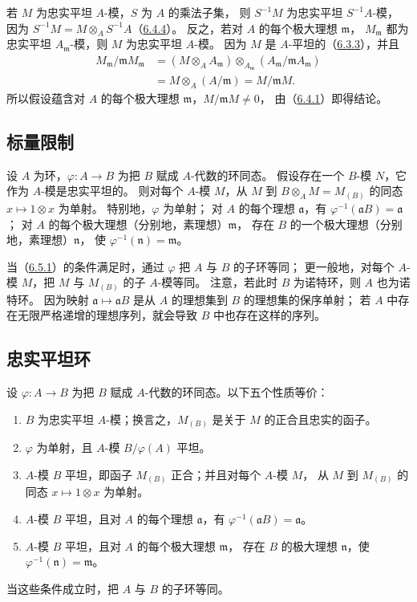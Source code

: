 若 $M$ 为忠实平坦 $A$-模，$S$ 为 $A$ 的乘法子集，
则 $S^{-1}M$ 为忠实平坦 $S^{-1}A$-模，
因为 $S^{-1}M=M\otimes_A S^{-1}A$（\hyperlink{para:0:6.4.4}{6.4.4}）。
反之，若对 $A$ 的每个极大理想 $\mathfrak m$，
$M_{\mathfrak m}$ 都为忠实平坦 $A_{\mathfrak m}$-模，则 $M$ 为忠实平坦 $A$-模。
因为 $M$ 是 $A$-平坦的（\hyperlink{para:0:6.3.3}{6.3.3}），并且
\[
 \begin{aligned}
 M_{\mathfrak m}/\mathfrak mM_{\mathfrak m}
 &=(M\otimes_A A_{\mathfrak m})
   \otimes_{A_{\mathfrak m}}(A_{\mathfrak m}/\mathfrak mA_{\mathfrak m})\\
 &=M\otimes_A(A/\mathfrak m)=M/\mathfrak mM.
 \end{aligned}
\]
所以假设蕴含对 $A$ 的每个极大理想 $\mathfrak m$，$M/\mathfrak mM\ne0$，
由（\hyperlink{para:0:6.4.1}{6.4.1}）即得结论。

\subsection{标量限制}\hypertarget{heading:0:6.5}{}

设 $A$ 为环，$\varphi\colon A\to B$ 为把 $B$ 赋成 $A$-代数的环同态。
假设存在一个 $B$-模 $N$，它作为 $A$-模是忠实平坦的。
则对每个 $A$-模 $M$，从 $M$ 到 $B\otimes_A M=M_{(B)}$ 的同态 $x\mapsto1\otimes x$ 为单射。
特别地，$\varphi$ 为单射；
对 $A$ 的每个理想 $\mathfrak a$，有 $\varphi^{-1}(\mathfrak aB)=\mathfrak a$；
对 $A$ 的每个极大理想（分别地，素理想）$\mathfrak m$，
存在 $B$ 的一个极大理想（分别地，素理想）$\mathfrak n$，
使 $\varphi^{-1}(\mathfrak n)=\mathfrak m$。

当（\hyperlink{para:0:6.5.1}{6.5.1}）的条件满足时，通过 $\varphi$ 把 $A$ 与 $B$ 的子环等同；
更一般地，对每个 $A$-模 $M$，把 $M$ 与 $M_{(B)}$ 的子 $A$-模等同。
注意，若此时 $B$ 为诺特环，则 $A$ 也为诺特环。
因为映射 $\mathfrak a\mapsto\mathfrak aB$ 是从 $A$ 的理想集到 $B$ 的理想集的保序单射；
若 $A$ 中存在无限严格递增的理想序列，就会导致 $B$ 中也存在这样的序列。

\subsection{忠实平坦环}\hypertarget{heading:0:6.6}{}

设 $\varphi\colon A\to B$ 为把 $B$ 赋成 $A$-代数的环同态。以下五个性质等价：
\begin{enumerate}[label=\alph*)]
\item $B$ 为忠实平坦 $A$-模；换言之，$M_{(B)}$ 是关于 $M$ 的正合且忠实的函子。
\item $\varphi$ 为单射，且 $A$-模 $B/\varphi(A)$ 平坦。
\item $A$-模 $B$ 平坦，即函子 $M_{(B)}$ 正合；并且对每个 $A$-模 $M$，
从 $M$ 到 $M_{(B)}$ 的同态 $x\mapsto1\otimes x$ 为单射。
\item $A$-模 $B$ 平坦，且对 $A$ 的每个理想 $\mathfrak a$，有
$\varphi^{-1}(\mathfrak aB)=\mathfrak a$。
\item $A$-模 $B$ 平坦，且对 $A$ 的每个极大理想 $\mathfrak m$，
存在 $B$ 的极大理想 $\mathfrak n$，使 $\varphi^{-1}(\mathfrak n)=\mathfrak m$。
\end{enumerate}
当这些条件成立时，把 $A$ 与 $B$ 的子环等同。

